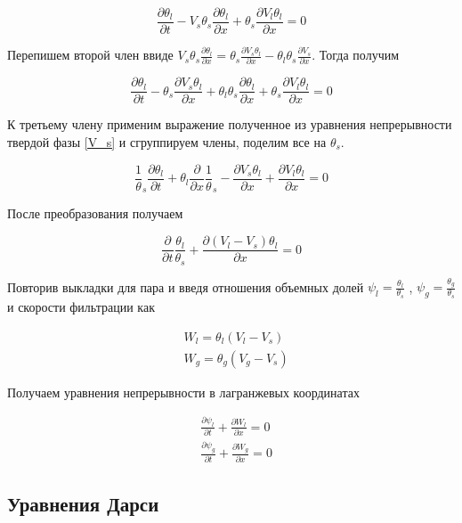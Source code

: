\documentclass[12pt,a4paper]{article}
\newcommand{\pd}[2]{\frac{\partial #1}{\partial #2}}
\begin{document}
\begin{equation}
\pd{\theta_l}{t} - V_s \theta_s \pd{\theta_l}{x} + \theta_s \pd{V_l \theta_l}{x} = 0
\end{equation}

Перепишем второй член ввиде $V_s \theta_s \pd{\theta_l}{x} = \theta_s \pd{V_s \theta_l}{x} - \theta_l \theta_s \pd{V_s}{x}$. Тогда получим

\begin{equation}
\pd{\theta_l}{t} - \theta_s \pd{V_s \theta_l}{x} + \theta_l \theta_s \pd{\theta_l}{x} + \theta_s \pd{V_l \theta_l}{x} = 0
\end{equation}

К третьему члену применим выражение полученное из уравнения непрерывности твердой фазы \eqref{V_s} и сгруппируем члены, поделим все на $\theta_s$.

\begin{equation}
\frac1\theta_s \pd{\theta_l}{t} + \theta_l \pd{}{x} \frac1\theta_s - \pd{V_s \theta_l}{x} + \pd{V_l \theta_l}{x} = 0
\end{equation}

После преобразования получаем

\begin{equation}
\pd{}{t}\frac{\theta_l}{\theta_s} + \pd{(V_l - V_s) \theta_l}{x} = 0
\end{equation}

Повторив выкладки для пара и введя отношения объемных долей $\psi_l = \frac{\theta_l}{\theta_s}$ , $ \psi_g = \frac{\theta_g}{\theta_s}$ и скорости фильтрации как

\begin{equation}
\begin{aligned}
&W_l = \theta_l (V_l - V_s)\\
&W_g = \theta_g (V_g - V_s)
\end{aligned}
\label{filtration_speed}
\end{equation}

Получаем уравнения непрерывности в лагранжевых координатах

\begin{equation}
\begin{aligned}
&\pd{\psi_l}{t} + \pd{W_l}{x} = 0\\
&\pd{\psi_g}{t} + \pd{W_g}{x} = 0
\end{aligned}
\end{equation}

\subsection{Уравнения Дарси}
\end{document}
